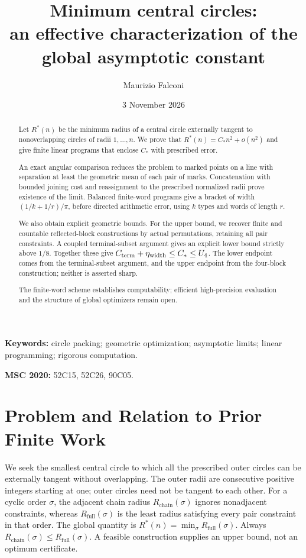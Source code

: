 \documentclass[11pt,letterpaper]{article}
\title{Minimum central circles:\\an effective characterization of the global asymptotic constant}
\author{Maurizio Falconi}
\date{3 November 2026}
\theoremstyle{definition}\newtheorem{definition}[theorem]{Definition}
\theoremstyle{remark}\newtheorem{remark}[theorem]{Remark}
\newcommand{\Rstar}{R^\ast}
\newcommand{\ch}{R_{\mathrm{chain}}}
\newcommand{\full}{R_{\mathrm{full}}}
\newcommand{\CC}{C_\ast}
\begin{document}
\maketitle
\nolinenumbers
\begin{abstract}
Let $\Rstar(n)$ be the minimum radius of a central circle externally tangent
to nonoverlapping circles of radii $1,\ldots,n$. We prove that
$\Rstar(n)=\CC n^2+o(n^2)$ and give finite linear programs that enclose
$\CC$ with prescribed error.

An exact angular comparison reduces the problem
to marked points on a line with separation at least the geometric mean of
each pair of marks. Concatenation with bounded joining cost and reassignment
to the prescribed normalized radii prove existence of the limit. Balanced finite-word
programs give a bracket of width $(1/k+1/r)/\pi$, before directed arithmetic
error, using $k$ types and words of length $r$.

We also obtain explicit geometric bounds. For the upper bound, we recover
finite and countable reflected-block constructions by actual permutations,
retaining all pair constraints. A coupled terminal-subset argument gives
an explicit lower bound strictly above $1/8$. Together these give
$C_{\rm term}+\eta_{\rm width}\le\CC\le U_4$.
The lower endpoint comes from the terminal-subset argument, and the upper
endpoint from the four-block construction; neither is asserted sharp.

The finite-word scheme establishes computability; efficient high-precision
evaluation and the structure of global optimizers remain open.
\end{abstract}
\noindent\textbf{Keywords:} circle packing; geometric optimization; asymptotic
limits; linear programming; rigorous computation.
\par\noindent\textbf{MSC 2020:} 52C15, 52C26, 90C05.


\section{Problem and Relation to Prior Finite Work}

We seek the smallest central circle to which all the prescribed outer
circles can be externally tangent without overlapping. The outer radii
are consecutive positive integers starting at one; outer circles need not
be tangent to each other. For a cyclic order $\sigma$, the adjacent
chain radius $\ch(\sigma)$ ignores nonadjacent constraints, whereas
$\full(\sigma)$ is the least radius satisfying every pair constraint in
that order. The global quantity is $\Rstar(n)=\min_\sigma\full(\sigma)$.
Always $\ch(\sigma)\le\full(\sigma)$. A feasible construction supplies
an upper bound, not an optimum certificate.
\end{document}
